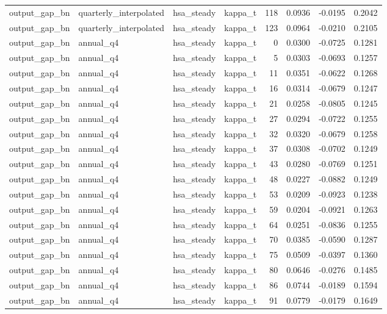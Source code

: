 \begin{tabular}{llllrrrr}
output\_gap\_bn & quarterly\_interpolated & hsa\_steady & kappa\_t & 118 & 0.0936 & -0.0195 & 0.2042 \\
output\_gap\_bn & quarterly\_interpolated & hsa\_steady & kappa\_t & 123 & 0.0964 & -0.0210 & 0.2105 \\
output\_gap\_bn & annual\_q4 & hsa\_steady & kappa\_t & 0 & 0.0300 & -0.0725 & 0.1281 \\
output\_gap\_bn & annual\_q4 & hsa\_steady & kappa\_t & 5 & 0.0303 & -0.0693 & 0.1257 \\
output\_gap\_bn & annual\_q4 & hsa\_steady & kappa\_t & 11 & 0.0351 & -0.0622 & 0.1268 \\
output\_gap\_bn & annual\_q4 & hsa\_steady & kappa\_t & 16 & 0.0314 & -0.0679 & 0.1247 \\
output\_gap\_bn & annual\_q4 & hsa\_steady & kappa\_t & 21 & 0.0258 & -0.0805 & 0.1245 \\
output\_gap\_bn & annual\_q4 & hsa\_steady & kappa\_t & 27 & 0.0294 & -0.0722 & 0.1255 \\
output\_gap\_bn & annual\_q4 & hsa\_steady & kappa\_t & 32 & 0.0320 & -0.0679 & 0.1258 \\
output\_gap\_bn & annual\_q4 & hsa\_steady & kappa\_t & 37 & 0.0308 & -0.0702 & 0.1249 \\
output\_gap\_bn & annual\_q4 & hsa\_steady & kappa\_t & 43 & 0.0280 & -0.0769 & 0.1251 \\
output\_gap\_bn & annual\_q4 & hsa\_steady & kappa\_t & 48 & 0.0227 & -0.0882 & 0.1249 \\
output\_gap\_bn & annual\_q4 & hsa\_steady & kappa\_t & 53 & 0.0209 & -0.0923 & 0.1238 \\
output\_gap\_bn & annual\_q4 & hsa\_steady & kappa\_t & 59 & 0.0204 & -0.0921 & 0.1263 \\
output\_gap\_bn & annual\_q4 & hsa\_steady & kappa\_t & 64 & 0.0251 & -0.0836 & 0.1255 \\
output\_gap\_bn & annual\_q4 & hsa\_steady & kappa\_t & 70 & 0.0385 & -0.0590 & 0.1287 \\
output\_gap\_bn & annual\_q4 & hsa\_steady & kappa\_t & 75 & 0.0509 & -0.0397 & 0.1360 \\
output\_gap\_bn & annual\_q4 & hsa\_steady & kappa\_t & 80 & 0.0646 & -0.0276 & 0.1485 \\
output\_gap\_bn & annual\_q4 & hsa\_steady & kappa\_t & 86 & 0.0744 & -0.0189 & 0.1594 \\
output\_gap\_bn & annual\_q4 & hsa\_steady & kappa\_t & 91 & 0.0779 & -0.0179 & 0.1649 \\

\end{tabular}
